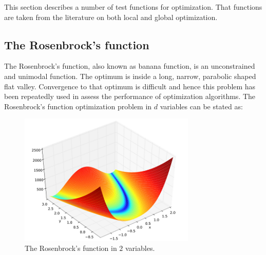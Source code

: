This section describes a number of test functions for
optimization. That functions are taken from the literature on both
local and global optimization.







\subsection*{The Rosenbrock's function}

The Rosenbrock's function, also known as banana function, is an
unconstrained and unimodal function. The optimum is inside a long,
narrow, parabolic shaped flat valley. Convergence to that optimum is
difficult and hence this problem has been repeatedly used in assess
the performance of optimization algorithms. The Rosenbrock's
function optimization problem in $d$ variables can be stated as:

\begin{figure}[h!]
\begin{center}
\includegraphics[width=0.75\textwidth]{function_optimization/rosenbrock_function.png}
\caption{The Rosenbrock's function in $2$
variables.}\label{RosenbrockFunction}
\end{center}
\end{figure}

